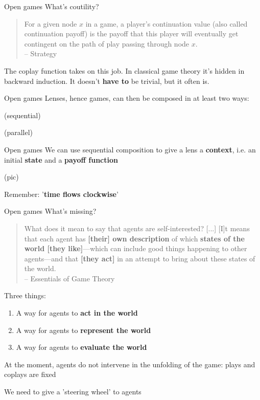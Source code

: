 \begin{frame}{Open games}
	What's coutility?

	\begin{quotation}
		For a given node $x$ in a game, a player’s continuation value (also called continuation payoff) is the payoff that this player will eventually get contingent on the path of play passing through node $x$.\\
		{\color{colornote}-- Strategy \cite{strategy}}
	\end{quotation}

	The coplay function takes on this job. In classical game theory it's hidden in backward induction.
	It doesn't \textbf{have to} be trivial, but it often is.
\end{frame}

\begin{frame}{Open games}
	Lenses, hence games, can then be composed in at least two ways:

	(sequential)

	(parallel)
\end{frame}

\begin{frame}{Open games}
	We can use sequential composition to give a lens a \textbf{context}, i.e. an initial \textbf{state} and a \textbf{payoff function}

	(pic)

	Remember: '\textbf{time flows clockwise}'
\end{frame}

\begin{frame}{Open games}
	What's missing?

	\begin{quotation}
		What does it mean to say that agents are self-interested? [...] [I]t means that each agent has \textbf{[their] own description} of which \textbf{states of the world [they like]}—which can include good things happening to other agents—and that \textbf{[they act]} in an attempt to bring about these states of the world.\\
		{\color{colornote}-- Essentials of Game Theory \cite{eogt}}
	\end{quotation}

	Three things:
	\begin{enumerate}
		\item A way for agents to \textbf{act in the world}
		\item A way for agents to \textbf{represent the world}
		\item A way for agents to \textbf{evaluate the world}
	\end{enumerate}

	At the moment, agents do not intervene in the unfolding of the game: plays and coplays are fixed

	We need to give a 'steering wheel' to agents
\end{frame}


